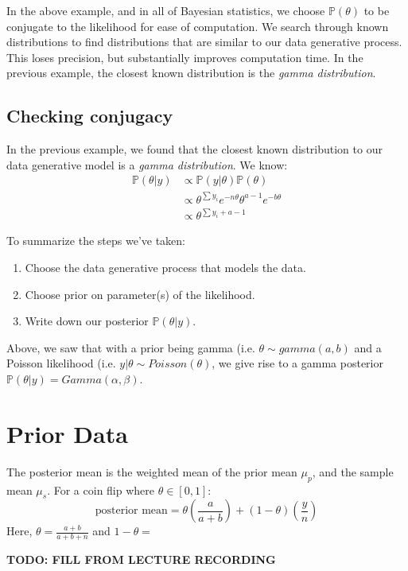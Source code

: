 \documentclass[titlepage, 12pt, leqno]{article}
\begin{document}
In the above example, and in all of Bayesian statistics, we choose
$\mathbb{P}(\theta)$ to be conjugate to the likelihood for ease of computation. 
We search through known distributions to find distributions that are similar to
our data generative process. This loses precision, but substantially improves
computation time. In the previous example, the closest known distribution is the
\textit{gamma distribution}.

\subsection{Checking conjugacy}
In the previous example, we found that the closest known distribution to our data
generative model is a \textit{gamma distribution}. We know:
\begin{align*}
    \mathbb{P}(\theta|y) &\propto \mathbb{P}(y|\theta)\mathbb{P}(\theta)\\
                         &\propto \theta^{\sum y_{i}}e^{-n\theta}\theta^{a-1}
                         e^{-b\theta}\\
                         &\propto \theta^{\sum y_{i}+a-1}
\end{align*}

To summarize the steps we've taken:
\begin{enumerate}
    \item Choose the data generative process that models the data.
    \item Choose prior on parameter(s) of the likelihood.
    \item Write down our posterior $\mathbb{P}(\theta|y)$.
\end{enumerate}

Above, we saw that with a prior being gamma (i.e. $\theta \sim gamma(a,b)$ and a
Poisson likelihood (i.e. $y|\theta \sim Poisson(\theta)$, we give rise to a
gamma posterior $\mathbb{P}(\theta|y) = Gamma(\alpha,\beta)$.

\pagebreak
\section{Prior Data}
\begin{note}
    The posterior mean is the weighted mean of the prior mean $\mu_{p}$, and the 
    sample mean $\mu_{s}$. For a coin flip where $\theta \in [0,1]$:
    \[
        \text{posterior mean} = \theta\left(\frac{a}{a+b}\right) + (1-\theta)
        \left(\frac{y}{n}\right)
    \]
    Here, $\theta = \frac{a+b}{a+b+n}$ and $1-\theta = $

    \textbf{TODO: FILL FROM LECTURE RECORDING}
\end{note}
\end{document}
